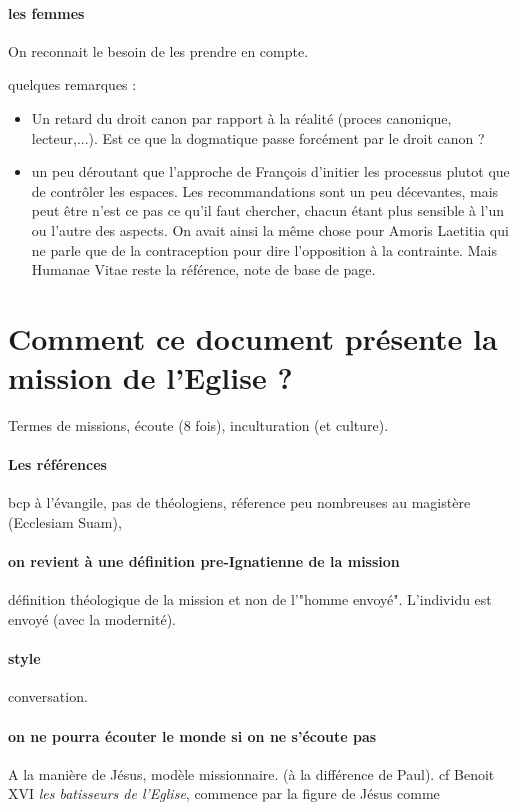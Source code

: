 \paragraph{les femmes} On reconnait le besoin de les prendre en compte. 



quelques remarques : 
\begin{itemize}
    \item Un retard du droit canon par rapport à la réalité (proces canonique, lecteur,...). Est ce que la dogmatique passe forcément par le droit canon ?
    \item un peu déroutant que l'approche de François d'initier les processus plutot que de contrôler les espaces. Les recommandations sont un peu décevantes, mais peut être n'est ce pas ce qu'il faut chercher, chacun étant plus sensible à l'un ou l'autre des aspects.
    On avait ainsi la même chose pour Amoris Laetitia qui ne parle que de la contraception pour dire l'opposition à la contrainte. Mais Humanae Vitae reste la référence, note de base de page. 

    
\end{itemize}

\section{Comment ce document présente la mission de l'Eglise ?}

Termes de missions, écoute (8 fois), inculturation (et culture). 



\paragraph{Les références} bcp à l'évangile, pas de théologiens, réference peu nombreuses au magistère (Ecclesiam Suam),

\paragraph{on revient à une définition pre-Ignatienne de la mission} définition théologique de la mission et non de l'"homme envoyé". L'individu est envoyé (avec la modernité). 


\paragraph{style} conversation. 

\paragraph{on ne pourra écouter le monde si on ne s'écoute pas} A la manière de Jésus, modèle missionnaire. (à la différence de Paul). cf Benoit XVI \textit{les batisseurs de l'Eglise}, commence par la figure de Jésus comme 


